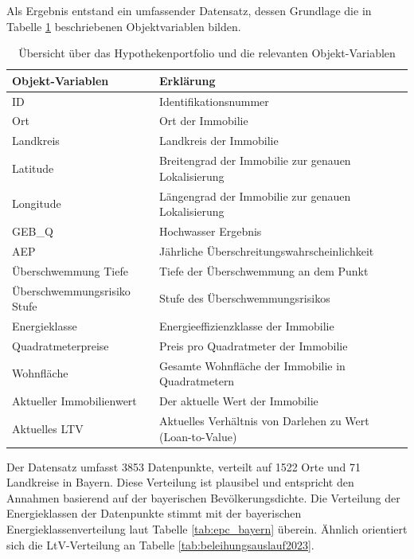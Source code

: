 Als Ergebnis entstand ein umfassender Datensatz, dessen Grundlage die in Tabelle \ref{tab:objekt-variablen} beschriebenen Objektvariablen bilden.
\begin{table}[htbp]
    \centering
    \small
    \caption{Übersicht über das Hypothekenportfolio und die relevanten Objekt-Variablen}
    \label{tab:objekt-variablen}
    \begin{tabularx}{1.0\textwidth}{>{\raggedright\arraybackslash}X >{\raggedright\arraybackslash}X}
        \toprule
        \textbf{Objekt-Variablen} & \textbf{Erklärung} \\
        \midrule
        ID & Identifikationsnummer \\
        \addlinespace
        Ort & Ort der Immobilie \\
        \addlinespace
        Landkreis & Landkreis der Immobilie \\
        \addlinespace
        Latitude & Breitengrad der Immobilie zur genauen Lokalisierung \\
        \addlinespace
        Longitude & Längengrad der Immobilie zur genauen Lokalisierung \\
        \addlinespace
        GEB\_Q & Hochwasser Ergebnis \\
        \addlinespace
        AEP & Jährliche Überschreitungswahrscheinlichkeit \\
        \addlinespace
        Überschwemmung Tiefe & Tiefe der Überschwemmung an dem Punkt \\
        \addlinespace
        Überschwemmungsrisiko Stufe & Stufe des Überschwemmungsrisikos \\
        \addlinespace
        Energieklasse & Energieeffizienzklasse der Immobilie \\
        \addlinespace
        Quadratmeterpreise & Preis pro Quadratmeter der Immobilie \\
        \addlinespace
        Wohnfläche & Gesamte Wohnfläche der Immobilie in Quadratmetern \\
        \addlinespace
        Aktueller Immobilienwert & Der aktuelle Wert der Immobilie \\
        \addlinespace        Aktuelles LTV & Aktuelles Verhältnis von Darlehen zu Wert (Loan-to-Value) \\
        \bottomrule
    \end{tabularx}
\end{table}
\FloatBarrier
Der Datensatz umfasst 3853 Datenpunkte, verteilt auf 1522 Orte und 71 Landkreise in Bayern. Diese Verteilung ist plausibel und entspricht den Annahmen basierend auf der bayerischen Bevölkerungsdichte. Die Verteilung der Energieklassen der Datenpunkte stimmt mit der bayerischen Energieklassenverteilung laut Tabelle \ref{tab:epc_bayern} überein. Ähnlich orientiert sich die LtV-Verteilung an Tabelle \ref{tab:beleihungsauslauf2023}.
